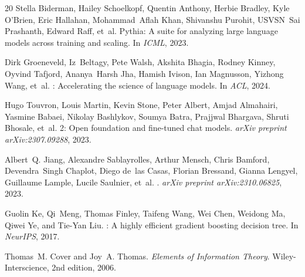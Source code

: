 \documentclass[11pt]{article}
\begin{document}
\begin{thebibliography}{20}
Stella Biderman, Hailey Schoelkopf, Quentin Anthony, Herbie Bradley, Kyle O'Brien, Eric Hallahan, Mohammad~Aflah Khan, Shivanshu Purohit, USVSN~Sai Prashanth, Edward Raff, et~al.
\newblock Pythia: A suite for analyzing large language models across training and scaling.
\newblock In \emph{ICML}, 2023.

Dirk Groeneveld, Iz~Beltagy, Pete Walsh, Akshita Bhagia, Rodney Kinney, Oyvind Tafjord, Ananya~Harsh Jha, Hamish Ivison, Ian Magnusson, Yizhong Wang, et~al.
: Accelerating the science of language models.
\newblock In \emph{ACL}, 2024.

Hugo Touvron, Louis Martin, Kevin Stone, Peter Albert, Amjad Almahairi, Yasmine Babaei, Nikolay Bashlykov, Soumya Batra, Prajjwal Bhargava, Shruti Bhosale, et~al.
 2: Open foundation and fine-tuned chat models.
\newblock \emph{arXiv preprint arXiv:2307.09288}, 2023.

Albert~Q. Jiang, Alexandre Sablayrolles, Arthur Mensch, Chris Bamford, Devendra~Singh Chaplot, Diego de~las Casas, Florian Bressand, Gianna Lengyel, Guillaume Lample, Lucile Saulnier, et~al.
.
\newblock \emph{arXiv preprint arXiv:2310.06825}, 2023.

Guolin Ke, Qi~Meng, Thomas Finley, Taifeng Wang, Wei Chen, Weidong Ma, Qiwei Ye, and Tie-Yan Liu.
: A highly efficient gradient boosting decision tree.
\newblock In \emph{NeurIPS}, 2017.

Thomas~M. Cover and Joy~A. Thomas.
\newblock \emph{Elements of Information Theory}.
\newblock Wiley-Interscience, 2nd edition, 2006.

\end{thebibliography}
\end{document}
